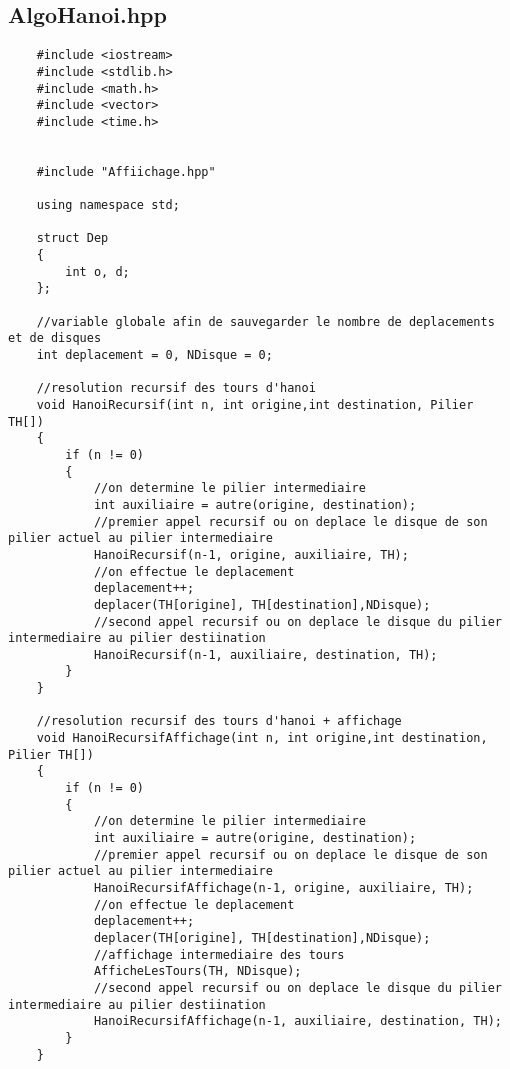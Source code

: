 \subsection*{AlgoHanoi.hpp}
\begin{verbatim}
    #include <iostream>
    #include <stdlib.h>
    #include <math.h>
    #include <vector>
    #include <time.h>
    
    
    #include "Affiichage.hpp"
    
    using namespace std;
    
    struct Dep
    {
        int o, d;
    };
    
    //variable globale afin de sauvegarder le nombre de deplacements et de disques
    int deplacement = 0, NDisque = 0;
    
    //resolution recursif des tours d'hanoi
    void HanoiRecursif(int n, int origine,int destination, Pilier TH[])
    {
        if (n != 0)
        {
            //on determine le pilier intermediaire
            int auxiliaire = autre(origine, destination);
            //premier appel recursif ou on deplace le disque de son pilier actuel au pilier intermediaire
            HanoiRecursif(n-1, origine, auxiliaire, TH);
            //on effectue le deplacement
            deplacement++;
            deplacer(TH[origine], TH[destination],NDisque);
            //second appel recursif ou on deplace le disque du pilier intermediaire au pilier destiination
            HanoiRecursif(n-1, auxiliaire, destination, TH);
        }
    }
    
    //resolution recursif des tours d'hanoi + affichage
    void HanoiRecursifAffichage(int n, int origine,int destination, Pilier TH[])
    {
        if (n != 0)
        {
            //on determine le pilier intermediaire
            int auxiliaire = autre(origine, destination);
            //premier appel recursif ou on deplace le disque de son pilier actuel au pilier intermediaire
            HanoiRecursifAffichage(n-1, origine, auxiliaire, TH);
            //on effectue le deplacement
            deplacement++;
            deplacer(TH[origine], TH[destination],NDisque);
            //affichage intermediaire des tours
            AfficheLesTours(TH, NDisque);
            //second appel recursif ou on deplace le disque du pilier intermediaire au pilier destiination
            HanoiRecursifAffichage(n-1, auxiliaire, destination, TH);
        }
    }
    

\end{verbatim}
